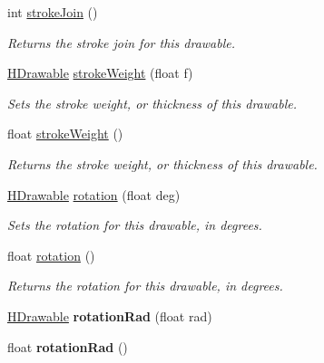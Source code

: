 \begin{DoxyCompactItemize}
int \hyperlink{classhype_1_1core_1_1drawable_1_1_h_drawable_a4fc12f2585819b1bd9ed0fc60cac74c0}{stroke\-Join} ()
\begin{DoxyCompactList}\small\item\em Returns the stroke join for this drawable. \end{DoxyCompactList}\item 
\hyperlink{classhype_1_1core_1_1drawable_1_1_h_drawable}{H\-Drawable} \hyperlink{classhype_1_1core_1_1drawable_1_1_h_drawable_a921f850d18263460a9a7117364262157}{stroke\-Weight} (float f)
\begin{DoxyCompactList}\small\item\em Sets the stroke weight, or thickness of this drawable. \end{DoxyCompactList}\item 
float \hyperlink{classhype_1_1core_1_1drawable_1_1_h_drawable_ab442156bac301c3e89040cbc1d90ce84}{stroke\-Weight} ()
\begin{DoxyCompactList}\small\item\em Returns the stroke weight, or thickness of this drawable. \end{DoxyCompactList}\item 
\hyperlink{classhype_1_1core_1_1drawable_1_1_h_drawable}{H\-Drawable} \hyperlink{classhype_1_1core_1_1drawable_1_1_h_drawable_a87f1d8b6e7108e5229b6b9cb5eaf45a5}{rotation} (float deg)
\begin{DoxyCompactList}\small\item\em Sets the rotation for this drawable, in degrees. \end{DoxyCompactList}\item 
float \hyperlink{classhype_1_1core_1_1drawable_1_1_h_drawable_a9cfc2146ce028c14a1063ff77d88fb6e}{rotation} ()
\begin{DoxyCompactList}\small\item\em Returns the rotation for this drawable, in degrees. \end{DoxyCompactList}\item 
\hypertarget{classhype_1_1core_1_1drawable_1_1_h_drawable_a2a52c76cb32def1904a540e0bc25cf69}{\hyperlink{classhype_1_1core_1_1drawable_1_1_h_drawable}{H\-Drawable} {\bfseries rotation\-Rad} (float rad)}\label{classhype_1_1core_1_1drawable_1_1_h_drawable_a2a52c76cb32def1904a540e0bc25cf69}

\item 
\hypertarget{classhype_1_1core_1_1drawable_1_1_h_drawable_a3950c94397be45408d68ab1c2017d062}{float {\bfseries rotation\-Rad} ()}\label{classhype_1_1core_1_1drawable_1_1_h_drawable_a3950c94397be45408d68ab1c2017d062}


\end{DoxyCompactItemize}
